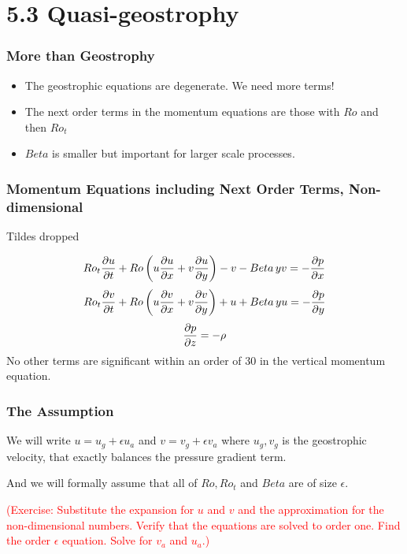 \documentclass[xcolor=dvipsnames]{beamer}
\begin{document}
\section{5.3 Quasi-geostrophy}

\begin{frame}
\frametitle{More than Geostrophy}

\begin{itemize}
\item The geostrophic equations are degenerate.  We need more terms!

\item The next order terms in the momentum equations are those with $Ro$ and then $Ro_t$ 

\item $Beta$ is smaller but important for larger scale processes.
\end{itemize}

\end{frame}

\begin{frame}
\frametitle{Momentum Equations including Next Order Terms, Non-dimensional}

Tildes dropped

\[
Ro_t \frac {\partial u}{\partial t} + Ro \left( u\frac {\partial u}{\partial x} + v\frac {\partial u}{\partial y} \right) - v - Beta\, y v = -\frac {\partial p}{\partial x} 
\]
\[
Ro_t \frac {\partial v}{\partial t} + Ro \left( u\frac {\partial v}{\partial x} + v\frac {\partial v}{\partial y} \right) + u + Beta\, y u = -\frac {\partial p}{\partial y} 
\]
\[
\frac {\partial p}{\partial z} = - \rho
\]
No other terms are significant within an order of 30 in the vertical momentum equation.

\end{frame}
\begin{frame}
\frametitle{The Assumption}

We will write $u = u_g + \epsilon u_a$ and $v = v_g + \epsilon v_a$ where $u_g,v_g$ is the geostrophic velocity, that exactly balances the pressure gradient term.

And we will formally assume that all of $Ro, Ro_t$ and $Beta$ are of size $\epsilon$.  

\vspace{0.2in}

\textcolor{red}{(Exercise: Substitute the expansion for $u$ and $v$ and the approximation for the non-dimensional numbers.  Verify that the equations are solved to order one.  Find the order $\epsilon$ equation.  Solve for $v_a$ and $u_a$.)}
\end{frame}
\end{document}

